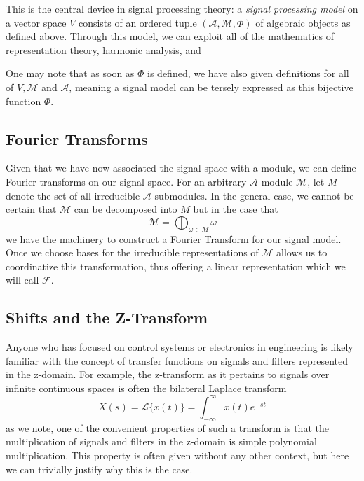 \documentclass[12pt,technote]{IEEEtran}
\begin{document}
This is the central device in signal processing theory: a \textit{signal processing model} on a vector space $V$ consists of an ordered tuple $(\mathcal{A}, \mathcal{M}, \Phi)$ of algebraic objects as defined above. Through this model, we can exploit all of the mathematics of representation theory, harmonic analysis, and

One may note that as soon as $\Phi$ is defined, we have also given definitions for all of $V, \mathcal{M}$ and $\mathcal{A}$, meaning a signal model can be tersely expressed as this bijective function $\Phi$.

\subsection{Fourier Transforms}
Given that we have now associated the signal space with a module, we can define Fourier transforms on our signal space. For an arbitrary $\mathcal{A}$-module $\mathcal{M}$, let $M$ denote the set of all irreducible $\mathcal{A}$-submodules. In the general case, we cannot be certain that $\mathcal{M}$ can be decomposed into $M$ but in the case that
\begin{equation*}
    \mathcal{M} = \bigoplus_{\omega\in M}\omega
\end{equation*}
we have the machinery to construct a Fourier Transform for our signal model. Once we choose bases for the irreducible representations of $\mathcal{M}$ allows us to coordinatize this transformation, thus offering a linear representation which we will call $\mathcal{F}$.

\subsection{Shifts and the Z-Transform}

Anyone who has focused on control systems or electronics in engineering is likely familiar with the concept of transfer functions on signals and filters represented in the z-domain. For example, the z-transform as it pertains to signals over infinite continuous spaces is often the bilateral Laplace transform
\begin{equation*}
    X(s) = \mathcal{L}\{x(t)\} = \int_{-\infty}^\infty x(t)e^{-st}
\end{equation*}
as we note, one of the convenient properties of such a transform is that the multiplication of signals and filters in the z-domain is simple polynomial multiplication. This property is often given without any other context, but here we can trivially justify why this is the case.
\end{document}
